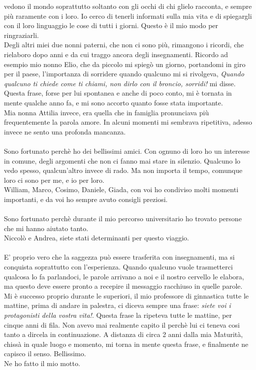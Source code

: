 vedono il mondo soprattutto soltanto con gli occhi di chi glielo racconta, e sempre più raramente con i loro. Io cerco di tenerli informati sulla mia vita e di spiegargli
con il loro linguaggio le cose di tutti i giorni. Questo è il mio modo per ringraziarli.
\\Degli altri miei due nonni paterni, che non ci sono più, rimangono i ricordi, che rielaboro dopo anni e da cui traggo ancora degli insegnamenti.
Ricordo ad esempio mio nonno Elio, che da piccolo mi spiegò un giorno, portandomi in giro per il paese, l'importanza di sorridere quando qualcuno mi si rivolgeva,
 \emph{Quando qualcuno ti chiede come ti chiami, non dirlo con il broncio, sorridi!} mi disse.
 Questa frase, forse per lui spontanea e anche di poco conto, mi è tornata in mente qualche anno fa, e mi sono accorto quanto fosse stata importante.
 \\
 Mia nonna Attilia invece, era quella che in famiglia pronunciava più frequentemente la parola amore. In alcuni momenti mi sembrava ripetitiva, 
 adesso invece ne sento una profonda mancanza.
\\\\
Sono fortunato perchè ho dei bellissimi amici. Con ognuno di loro ho un interesse in comune, degli argomenti che non ci fanno mai stare in silenzio.
Qualcuno lo vedo spesso, qualcun'altro invece di rado. Ma non importa il tempo, comunque loro ci sono per me, e io per loro.
\\William, Marco, Cosimo, Daniele, Giada, con voi ho condiviso molti momenti importanti, e da voi ho sempre avuto consigli preziosi.
\\\\
Sono fortunato perchè durante il mio percorso universitario ho trovato persone che mi hanno aiutato tanto.
\\Niccolò e Andrea, siete stati determinanti per questo viaggio.
\\\\
 E' proprio vero che la saggezza può essere trasferita con insegnamenti, ma si conquista soprattutto con l'esperienza.
 Quando qualcuno vuole trasmetterci qualcosa lo fa parlandoci, 
 le parole arrivano a noi e il nostro cervello le elabora, ma questo deve essere pronto a recepire il messaggio racchiuso in quelle parole.
 Mi è successo proprio durante le superiori, il mio professore di ginnastica tutte le mattine, prima di andare in palestra, ci diceva sempre una frase: 
 \emph{siete voi i protagonisti della vostra vita!}. Questa frase la ripeteva tutte le mattine, per cinque anni di fila. 
 Non avevo mai realmente capito il perchè lui ci teneva cosi tanto a dircela in continuazione.
 A distanza di circa 2 anni dalla mia Maturità, chissà in quale luogo e momento, mi torna in mente questa frase, e finalmente ne capisco il senso. Bellissimo.
 \\Ne ho fatto il mio motto.

